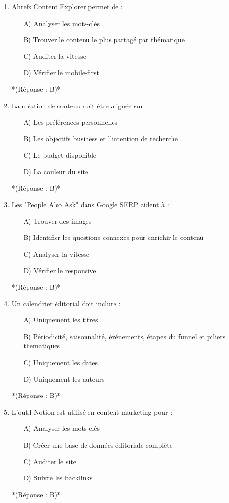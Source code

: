\documentclass[12pt,a4paper,twoside]{report}
\begin{document}
\begin{enumerate}
\item Ahrefs Content Explorer permet de :
\begin{itemize}
\item[A)] Analyser les mots-clés
\item[B)] Trouver le contenu le plus partagé par thématique
\item[C)] Auditer la vitesse
\item[D)] Vérifier le mobile-first
\end{itemize}
*(Réponse : B)*

\item La création de contenu doit être alignée sur :
\begin{itemize}
\item[A)] Les préférences personnelles
\item[B)] Les objectifs business et l'intention de recherche
\item[C)] Le budget disponible
\item[D)] La couleur du site
\end{itemize}
*(Réponse : B)*

\item Les "People Also Ask" dans Google SERP aident à :
\begin{itemize}
\item[A)] Trouver des images
\item[B)] Identifier les questions connexes pour enrichir le contenu
\item[C)] Analyser la vitesse
\item[D)] Vérifier le responsive
\end{itemize}
*(Réponse : B)*

\item Un calendrier éditorial doit inclure :
\begin{itemize}
\item[A)] Uniquement les titres
\item[B)] Périodicité, saisonnalité, événements, étapes du funnel et piliers thématiques
\item[C)] Uniquement les dates
\item[D)] Uniquement les auteurs
\end{itemize}
*(Réponse : B)*

\item L'outil Notion est utilisé en content marketing pour :
\begin{itemize}
\item[A)] Analyser les mots-clés
\item[B)] Créer une base de données éditoriale complète
\item[C)] Auditer le site
\item[D)] Suivre les backlinks
\end{itemize}
*(Réponse : B)*


\end{enumerate}
\end{document}

